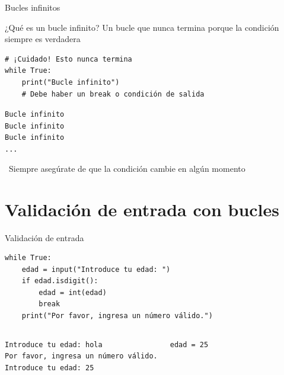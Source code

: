 \documentclass{beamer}
\begin{document}
\begin{frame}[fragile]{Bucles infinitos \faInfinity}
\begin{conceptbox}{¿Qué es un bucle infinito?}
Un bucle que nunca termina porque la condición siempre es verdadera
\end{conceptbox}

\begin{lstlisting}
# ¡Cuidado! Esto nunca termina
while True:
    print("Bucle infinito")
    # Debe haber un break o condición de salida
\end{lstlisting}

\vspace{-0.2cm}
\begin{tcolorbox}[colback=yellow!10,colframe=orange,title={\small\faExclamationTriangle \ Salida (parcial)},coltitle=fg0,left=3pt,right=3pt,top=2pt,bottom=2pt,boxsep=1pt]
\small\texttt{Bucle infinito\\
Bucle infinito\\
Bucle infinito\\
...}
\end{tcolorbox}

\vspace{-0.1cm}
\begin{notebox}
\small\faExclamationTriangle\ Siempre asegúrate de que la condición cambie en algún momento
\end{notebox}
\end{frame}

\section{Validación de entrada con bucles}

\begin{frame}[fragile]{Validación de entrada \faCheckCircle}
\begin{lstlisting}
while True:
    edad = input("Introduce tu edad: ")
    if edad.isdigit():
        edad = int(edad)
        break
    print("Por favor, ingresa un número válido.")
\end{lstlisting}

\vspace{0.2cm}
\begin{columns}[T]
\begin{tcolorbox}[colback=blue!10,colframe=blue,title={\small\faArrowDown \ Entrada},coltitle=fg0,left=2pt,right=2pt,top=2pt,bottom=2pt]
\small\texttt{Introduce tu edad: hola\\
Por favor, ingresa un número válido.\\
Introduce tu edad: 25}
\end{tcolorbox}

\begin{tcolorbox}[colback=green!10,colframe=green,title={\small\faArrowUp \ Salida final},coltitle=fg0,left=2pt,right=2pt,top=2pt,bottom=2pt]
\small\texttt{edad = 25}
\end{tcolorbox}
\end{columns}
\end{frame}
\end{document}

